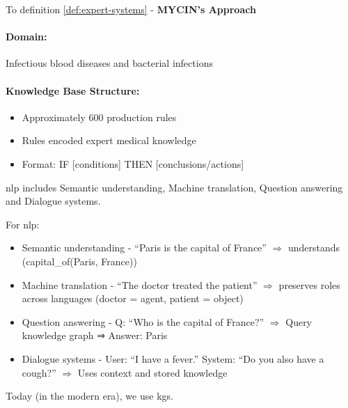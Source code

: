 
\begin{bsp}
    To definition \autoref{def:expert-systems} - \textbf{MYCIN’s Approach} \\

    \paragraph{Domain:}
    Infectious blood diseases and bacterial infections

    \paragraph{Knowledge Base Structure:}
    \begin{itemize}
        \item Approximately 600 production rules
        \item Rules encoded expert medical knowledge
        \item Format: IF [conditions] THEN [conclusions/actions]
    \end{itemize}
\end{bsp}


\gls{nlp} includes Semantic understanding, Machine translation, Question answering and Dialogue systems.

\begin{bsp}
    For \gls{nlp}:
    \begin{itemize}
        \item Semantic understanding - “Paris is the capital of France” $\Rightarrow$ understands
        (capital\_of(Paris, France))
        \item Machine translation - “The doctor treated the patient” $\Rightarrow$  preserves roles across
        languages (doctor = agent, patient = object)
        \item Question answering - Q: “Who is the capital of France?” $\Rightarrow$  Query knowledge
        graph ⇒ Answer: Paris
        \item Dialogue systems - User: “I have a fever.” System: “Do you also have a cough?”
        $\Rightarrow$  Uses context and stored knowledge
    \end{itemize}
\end{bsp}

Today (in the modern era), we use \glspl{kg}.


